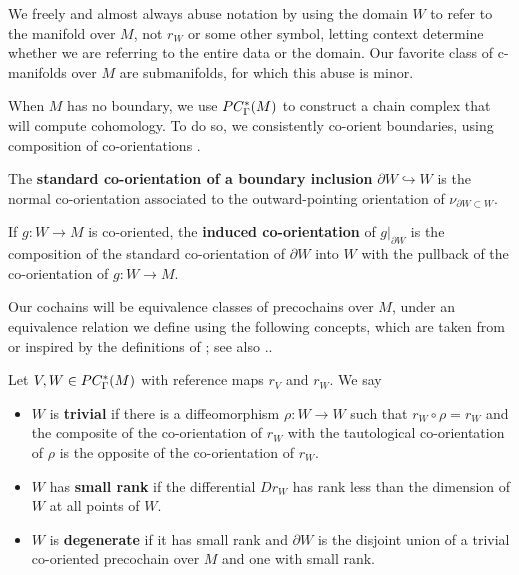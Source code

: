 We freely and almost always abuse notation by using the domain $W$ to refer to the manifold over $M$, not $r_W$ or some other symbol, letting context determine whether we are referring to the entire data or the domain.
Our favorite class of c-manifolds over $M$ are submanifolds, for which this abuse is minor.

When $M$ has no boundary, we use $PC_\Gamma^*(M)$ to construct a chain complex that will compute cohomology.
To do so, we consistently co-orient boundaries, using composition of co-orientations \cite[Section 3.3.2]{medina2022foundations}.

\begin{definition}\label{D:boundary co-orientation}
	The {\bf standard co-orientation of a boundary inclusion} $\partial W \hookrightarrow W$ is the normal co-orientation associated to the outward-pointing orientation of $\nu_{\partial W \subset W}$.

	If $g \colon W \to M$ is co-oriented, the {\bf induced co-orientation} of $g|_{\partial W}$ is the composition of the standard co-orientation of $\partial W$ into $W$ with the pullback of the co-orientation of $g \colon W \to M$.
\end{definition}

Our cochains will be equivalence classes of precochains over $M$, under an equivalence relation we define using the following concepts, which are taken from or inspired by the definitions of \cite{Lipy14}; see also \cite[Section 4.1]{medina2022foundations}..

\begin{definition}\label{D:cman types}
	Let $V, W\in PC_\Gamma^*(M)$ with reference maps $r_V$ and $r_W$.
	We say
	\begin{itemize}
		\item $W$ is \textbf{trivial} if there is a diffeomorphism $\rho \colon W \to W$ such that $r_W \circ \rho = r_W$
		and the composite of the co-orientation of $r_W$ with the tautological co-orientation of $\rho$ is the opposite of the co-orientation of $r_W$.
		\item $W$ has \textbf{small rank} if the differential $D r_W$ has rank less than the dimension of $W$ at all points of $W$.
		\item $W$ is \textbf{degenerate} if it has small rank and ${\partial W}$ is the disjoint union of a trivial co-oriented precochain over $M$ and one with small rank.
	\end{itemize}
\end{definition}

